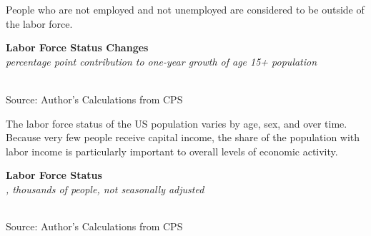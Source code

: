 \documentclass{report}
\makeatletter
\newcommand{\tbllink}[1]{\href{https://raw.githubusercontent.com/bdecon/US-chartbook/master/chartbook/data/#1}{\faTable}}
\newcommand*\short[1]{\expandafter\@gobbletwo\number\numexpr#1\relax}
\newcommand{\ctsbar}[5]{
		\addplot[ybar stacked, bar width=#5, draw opacity=0, fill=#1] 
			table [x=#2, y=#3, col sep=comma]{#4};}
\newcommand{\dateaxisticks}{
		date coordinates in=x, axis line style={draw=none},
		xmax={2022-03-15},
		max space between ticks=40,	    
		xtick={{1990-01-01}, {1992-01-01}, {1994-01-01}, 
			{1996-01-01}, {1998-01-01}, {2000-01-01}, 
			{2002-01-01}, {2004-01-01}, {2006-01-01},
			{2008-01-01}, {2010-01-01}, {2012-01-01}, {2014-01-01},
		    {2016-01-01}, {2018-01-01}, {2020-01-01}, {2022-01-01}, 
		    {2024-01-01}, {2026-01-01}},
		minor xtick={{1989-01-01}, {1991-01-01}, {1993-01-01},
			{1995-01-01}, {1997-01-01}, {1999-01-01}, 
			{2001-01-01}, {2003-01-01}, {2005-01-01}, {2007-01-01},
		    {2009-01-01}, {2011-01-01}, {2013-01-01}, {2015-01-01},
		    {2017-01-01}, {2019-01-01}, {2021-01-01}, {2023-01-01}, 
		    {2025-01-01}, {2027-01-01}},
		enlarge y limits={0.06}, enlarge x limits={0.01},
		}
\newcommand{\bbar}[2]{extra #1 ticks = {{#2}}, extra #1 tick labels = ,
		extra #1 tick style = {grid=major, grid style={thick, black!25}},}
\newcommand{\rbars}{
		\fill[color=black!10] (axis cs:{1990-07-01},\pgfkeysvalueof{/pgfplots/ymin}) rectangle 
			(axis cs:{1991-03-01}, \pgfkeysvalueof{/pgfplots/ymax});
		\fill[color=black!10] (axis cs:{2007-12-01},\pgfkeysvalueof{/pgfplots/ymin}) rectangle 
			(axis cs:{2009-07-01}, \pgfkeysvalueof{/pgfplots/ymax});
		\fill[color=black!10] (axis cs:{2001-03-01},\pgfkeysvalueof{/pgfplots/ymin}) rectangle 
			(axis cs:{2001-11-01}, \pgfkeysvalueof{/pgfplots/ymax});
		\fill[color=black!10] (axis cs:{2020-02-01},\pgfkeysvalueof{/pgfplots/ymin}) rectangle 
			(axis cs:{2020-05-01}, \pgfkeysvalueof{/pgfplots/ymax});}
\makeatother
\begin{document}
{\begin{minipage}{0.76\textwidth}
People who are not employed and not unemployed are considered to be outside of the labor force.  
\vspace{1mm}

\normalsize \textbf{Labor Force Status Changes}\\
\footnotesize{\textit{percentage point contribution to one-year growth of age 15+ population}}\\
\hspace*{-2mm} \\
\footnotesize{Source: Author's Calculations from CPS} \hfill \tbllink{cps_lfs2.csv}
\end{minipage}
\newpage
\begin{minipage}{0.76\textwidth}
\small The labor force status of the US population varies by age, sex, and over time. Because very few people receive capital income, the share of the population with labor income is particularly important to overall levels of economic activity. 
\vspace{2mm}

\normalsize \textbf{Labor Force Status}\\
\footnotesize{\textit{\unskip, thousands of people, not seasonally adjusted}}\\
\noindent {} \setlength{\tabcolsep}{3.0pt} \color{black!90}
		{\renewcommand{\arraystretch}{1.52}
		 \begin{tabular}{p{27.8mm} R{11.2mm} R{10.4mm} R{10.4mm} R{10.2mm} 
		 				 R{10.6mm} R{10.4mm} R{10.4mm}}
			  \hline
		\end{tabular}}
\vspace{-2mm}	
	
\footnotesize{Source: Author's Calculations from CPS}
\vspace{4mm}


\end{minipage}}
\end{document}

